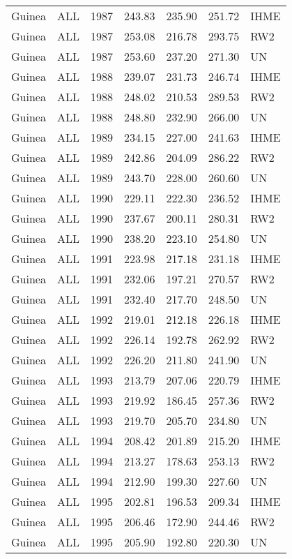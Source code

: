 \begin{longtable}{lllrrrl}
  Guinea & ALL & 1987 & 243.83 & 235.90 & 251.72 & IHME \\ 
  Guinea & ALL & 1987 & 253.08 & 216.78 & 293.75 & RW2 \\ 
  Guinea & ALL & 1987 & 253.60 & 237.20 & 271.30 & UN \\ 
  Guinea & ALL & 1988 & 239.07 & 231.73 & 246.74 & IHME \\ 
  Guinea & ALL & 1988 & 248.02 & 210.53 & 289.53 & RW2 \\ 
  Guinea & ALL & 1988 & 248.80 & 232.90 & 266.00 & UN \\ 
  Guinea & ALL & 1989 & 234.15 & 227.00 & 241.63 & IHME \\ 
  Guinea & ALL & 1989 & 242.86 & 204.09 & 286.22 & RW2 \\ 
  Guinea & ALL & 1989 & 243.70 & 228.00 & 260.60 & UN \\ 
  Guinea & ALL & 1990 & 229.11 & 222.30 & 236.52 & IHME \\ 
  Guinea & ALL & 1990 & 237.67 & 200.11 & 280.31 & RW2 \\ 
  Guinea & ALL & 1990 & 238.20 & 223.10 & 254.80 & UN \\ 
  Guinea & ALL & 1991 & 223.98 & 217.18 & 231.18 & IHME \\ 
  Guinea & ALL & 1991 & 232.06 & 197.21 & 270.57 & RW2 \\ 
  Guinea & ALL & 1991 & 232.40 & 217.70 & 248.50 & UN \\ 
  Guinea & ALL & 1992 & 219.01 & 212.18 & 226.18 & IHME \\ 
  Guinea & ALL & 1992 & 226.14 & 192.78 & 262.92 & RW2 \\ 
  Guinea & ALL & 1992 & 226.20 & 211.80 & 241.90 & UN \\ 
  Guinea & ALL & 1993 & 213.79 & 207.06 & 220.79 & IHME \\ 
  Guinea & ALL & 1993 & 219.92 & 186.45 & 257.36 & RW2 \\ 
  Guinea & ALL & 1993 & 219.70 & 205.70 & 234.80 & UN \\ 
  Guinea & ALL & 1994 & 208.42 & 201.89 & 215.20 & IHME \\ 
  Guinea & ALL & 1994 & 213.27 & 178.63 & 253.13 & RW2 \\ 
  Guinea & ALL & 1994 & 212.90 & 199.30 & 227.60 & UN \\ 
  Guinea & ALL & 1995 & 202.81 & 196.53 & 209.34 & IHME \\ 
  Guinea & ALL & 1995 & 206.46 & 172.90 & 244.46 & RW2 \\ 
  Guinea & ALL & 1995 & 205.90 & 192.80 & 220.30 & UN \\ 

\end{longtable}
